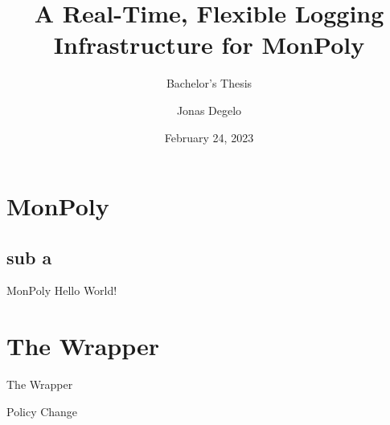 \documentclass{beamer}
\title{A Real-Time, Flexible Logging Infrastructure for MonPoly}
\subtitle{Bachelor's Thesis}
\author{Jonas Degelo}
\institute{ETH Zürich}
\date{February 24, 2023}
\begin{document}
\begin{frame}
\titlepage
\end{frame}

\section{MonPoly}
\subsection{sub a}

\begin{frame} {MonPoly}
    Hello World!
    
\end{frame}


\section{The Wrapper}

\begin{frame}{The Wrapper}
    
\end{frame}

\begin{frame}{Policy Change}
    
\end{frame}
\end{document}
